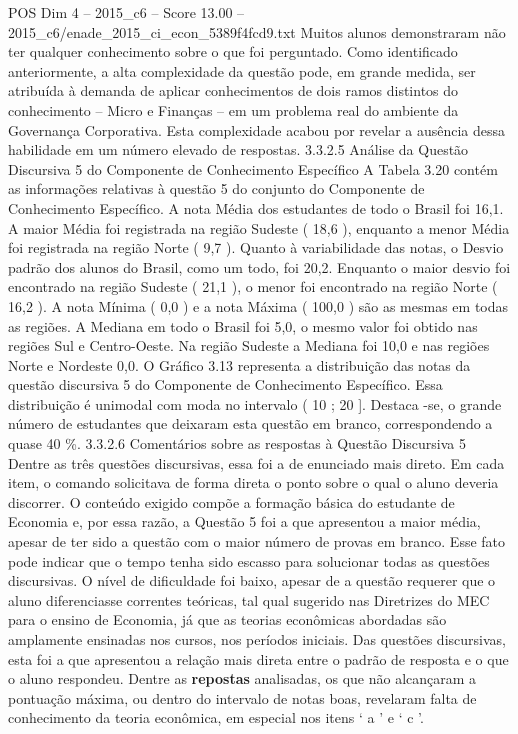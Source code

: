 \begin{textsample}{POS Dim 4 – 2015\_c6 – Score 13.00 – 2015\_c6/enade\_2015\_ci\_econ\_5389f4fcd9.txt}
Muitos alunos demonstraram não ter qualquer conhecimento sobre o que foi perguntado.
Como identificado anteriormente, a alta complexidade da questão pode, em grande medida, ser atribuída à demanda de aplicar conhecimentos de dois ramos distintos do conhecimento – Micro e Finanças – em um problema real do ambiente da Governança Corporativa.
Esta complexidade acabou por revelar a ausência dessa habilidade em um número elevado de respostas. 3.3.2.5 Análise da Questão Discursiva 5 do Componente de Conhecimento Específico A Tabela 3.20 contém as informações relativas à questão 5 do conjunto do Componente de Conhecimento Específico.
A nota Média dos estudantes de todo o Brasil foi 16,1.
A maior Média foi registrada na região Sudeste ( 18,6 ), enquanto a menor Média foi registrada na região Norte ( 9,7 ).
Quanto à variabilidade das notas, o Desvio padrão dos alunos do Brasil, como um todo, foi 20,2.
Enquanto o maior desvio foi encontrado na região Sudeste ( 21,1 ), o menor foi encontrado na região Norte ( 16,2 ).
A nota Mínima ( 0,0 ) e a nota Máxima ( 100,0 ) são as mesmas em todas as regiões.
A Mediana em todo o Brasil foi 5,0, o mesmo valor foi obtido nas regiões Sul e Centro-Oeste.
Na região Sudeste a Mediana foi 10,0 e nas regiões Norte e Nordeste 0,0.
O Gráfico 3.13 representa a distribuição das notas da questão discursiva 5 do Componente de Conhecimento Específico.
Essa distribuição é unimodal com moda no intervalo ( 10 ; 20 ].
Destaca -se, o grande número de estudantes que deixaram esta questão em branco, correspondendo a quase 40 \%. 3.3.2.6 Comentários sobre as respostas à Questão Discursiva 5 Dentre as três questões discursivas, essa foi a de enunciado mais direto.
Em cada item, o comando solicitava de forma direta o ponto sobre o qual o aluno deveria discorrer.
O conteúdo exigido compõe a formação básica do estudante de Economia e, por essa razão, a Questão 5 foi a que apresentou a maior média, apesar de ter sido a questão com o maior número de provas em branco.
Esse fato pode indicar que o tempo tenha sido escasso para solucionar todas as questões discursivas.
O nível de dificuldade foi baixo, apesar de a questão requerer que o aluno diferenciasse correntes teóricas, tal qual sugerido nas Diretrizes do MEC para o ensino de Economia, já que as teorias econômicas abordadas são amplamente ensinadas nos cursos, nos períodos iniciais.
Das questões discursivas, esta foi a que apresentou a relação mais direta entre o padrão de resposta e o que o aluno respondeu.
Dentre as \textbf{repostas} analisadas, os que não alcançaram a pontuação máxima, ou dentro do intervalo de notas boas, revelaram falta de conhecimento da teoria econômica, em especial nos itens ‘ a ’ e ‘ c ’.

\end{textsample}
